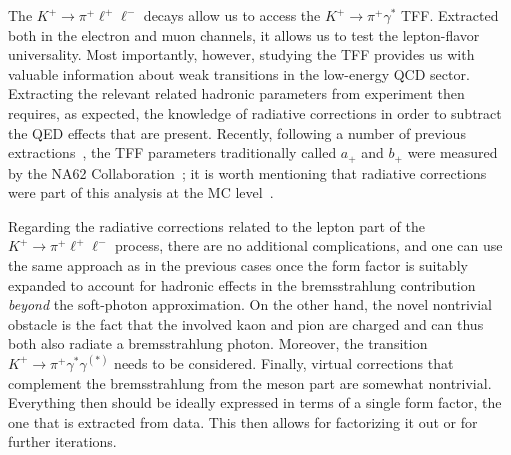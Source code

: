 The $K^+\to\pi^+\ell^+\ell^-$ decays allow us to access the $K^+\to\pi^+\gamma^*$ TFF.
Extracted both in the electron and muon channels, it allows us to test the lepton-flavor universality.
Most importantly, however, studying the TFF provides us with valuable information about weak transitions in the low-energy QCD sector.
Extracting the relevant related hadronic parameters from experiment then requires, as expected, the knowledge of radiative corrections in order to subtract the QED effects that are present.
Recently, following a number of previous extractions~\cite{E865:1999ker,NA482:2009pfe,NA482:2010zrc}, the TFF parameters traditionally called $a_+$ and $b_+$ were measured by the NA62 Collaboration~\cite{NA62:2022qes}; it is worth mentioning that radiative corrections were part of this analysis at the MC level~\cite{Kubis:2010mp,Husek:2022fsc}.

Regarding the radiative corrections related to the lepton part of the $K^+\to\pi^+\ell^+\ell^-$ process, there are no additional complications, and one can use the same approach as in the previous cases once the form factor is suitably expanded to account for hadronic effects in the bremsstrahlung contribution {\em beyond} the soft-photon approximation.
On the other hand, the novel nontrivial obstacle is the fact that the involved kaon and pion are charged and can thus both also radiate a bremsstrahlung photon.
Moreover, the transition $K^+\to\pi^+\gamma^*\gamma^{(*)}$ needs to be considered.
Finally, virtual corrections that complement the bremsstrahlung from the meson part are somewhat nontrivial.
Everything then should be ideally expressed in terms of a single form factor, the one that is extracted from data.
This then allows for factorizing it out or for further iterations.
